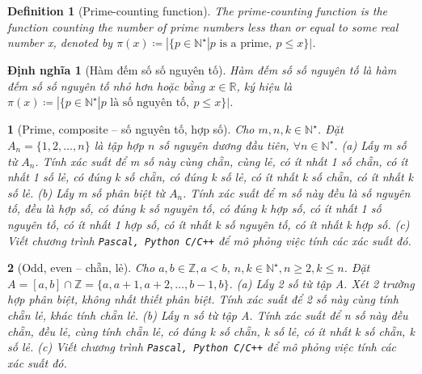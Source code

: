 \documentclass{article}
\newtheorem{baitoan}{}
\newtheorem{definition}{Definition}
\newtheorem{dinhnghia}{Định nghĩa}
\begin{document}
\begin{definition}[Prime-counting function]
	The {\rm prime-counting function} is the function counting the number of prime numbers less than or equal to some real number x, denoted by $\pi(x)\coloneqq|\{p\in\mathbb{N}^\star|p \mbox{ is a prime},\ p\le x\}|$.
\end{definition}

\begin{dinhnghia}[Hàm đếm số số nguyên tố]
	{\rm Hàm đếm số số nguyên tố} là hàm đếm số số nguyên tố nhỏ hơn hoặc bằng $x\in\mathbb{R}$, ký hiệu là $\pi(x)\coloneqq|\{p\in\mathbb{N}^\star|p \mbox{ là số nguyên tố},\ p\le x\}|$.
\end{dinhnghia}

\begin{baitoan}[Prime, composite -- số nguyên tố, hợp số]
	Cho $m,n,k\in\mathbb{N}^\star$. Đặt $A_n = \{1,2,\ldots,n\}$ là tập hợp $n$ số nguyên dương đầu tiên, $\forall n\in\mathbb{N}^\star$. (a) Lấy m số từ $A_n$. Tính xác suất để m số này cùng chẵn, cùng lẻ, có ít nhất 1 số chẵn, có ít nhất 1 số lẻ, có đúng k số chẵn, có đúng k số lẻ, có ít nhất k số chẵn, có ít nhất k số lẻ. (b) Lấy m số phân biệt từ $A_n$. Tính xác suất để m số này đều là số nguyên tố, đều là hợp số, có đúng k số nguyên tố, có đúng k hợp số, có ít nhất 1 số nguyên tố, có ít nhất 1 hợp số, có ít nhất k số nguyên tố, có ít nhất k hợp số. (c) Viết chương trình {\tt Pascal, Python C{\tt/}C++} để mô phỏng việc tính các xác suất đó.
\end{baitoan}

\begin{baitoan}[Odd, even -- chẵn, lẻ]
	Cho $a,b\in\mathbb{Z},a < b$, $n,k\in\mathbb{N}^\star,n\ge2,k\le n$. Đặt $A = [a,b]\cap\mathbb{Z} = \{a,a + 1,a + 2,\ldots,b - 1,b\}$. (a) Lấy 2 số từ tập A. Xét 2 trường hợp phân biệt, không nhất thiết phân biệt. Tính xác suất để 2 số này cùng tính chẵn lẻ, khác tính chẵn lẻ. (b) Lấy n số từ tập A. Tính xác suất để n số này đều chẵn, đều lẻ, cùng tính chẵn lẻ, có đúng k số chẵn, k số lẻ, có ít nhất k số chẵn, k số lẻ. (c) Viết chương trình {\tt Pascal, Python C{\tt/}C++} để mô phỏng việc tính các xác suất đó.
\end{baitoan}


\printbibliography[heading=bibintoc]
	
\end{document}
